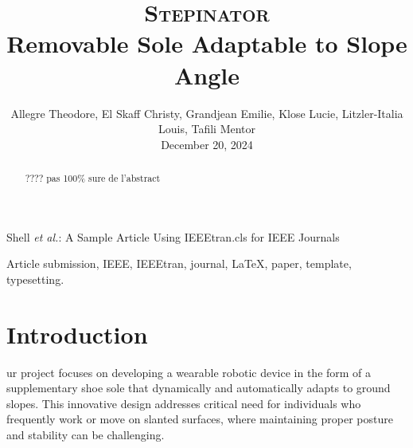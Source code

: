 \documentclass[lettersize,journal]{IEEEtran}
\begin{document}
\title{\textsc{Stepinator} \\ \LARGE {Removable Sole Adaptable to Slope Angle}}

\author{Allegre Theodore, El Skaff Christy, Grandjean Emilie, Klose Lucie, Litzler-Italia Louis, Tafili Mentor \\ December 20, 2024}

%
{Shell \MakeLowercase{\textit{et al.}}: A Sample Article Using  IEEEtran.cls for IEEE Journals}


\maketitle

\begin{abstract}
???? pas 100\% sure de l'abstract




\end{abstract}

\begin{IEEEkeywords}
Article submission, IEEE, IEEEtran, journal, \LaTeX, paper, template, typesetting.
\end{IEEEkeywords}

\section{Introduction}
ur project focuses on developing a wearable robotic device in the form of a supplementary shoe sole that dynamically and automatically adapts to ground slopes. This innovative design addresses critical need for individuals who frequently work or move on slanted surfaces, where maintaining proper posture and stability can be challenging.
\end{document}
